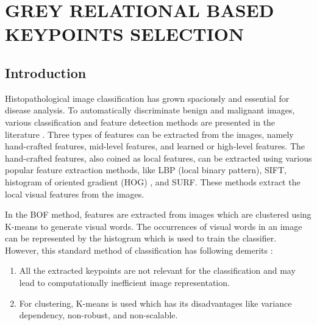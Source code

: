 

\chapter{GREY RELATIONAL BASED KEYPOINTS SELECTION}\label{Ch3:GKS}
\graphicspath{{Chapter3/Chapter3Figs/}{Chapter3/Chapter3Figs/}}

\section{Introduction}\label{ch3:sec:introduction}

Histopathological image classification has grown spaciously and essential for disease analysis. To automatically discriminate benign and malignant images, various classification and feature detection methods are presented in the literature \cite{saraswat2013}. Three types of features can be extracted from the images, namely hand-crafted features, mid-level features, and learned or high-level features. The hand-crafted features, also coined as local features, can be extracted using various popular feature extraction methods, like  LBP (local binary pattern), SIFT, histogram of oriented gradient (HOG) \cite{dalal2005histograms}, and SURF. These methods extract the local visual features from the images. 


In the BOF method, features are extracted from images which are clustered using K-means to generate visual words. The occurrences of visual words in an image can be represented by the histogram which is used to train the classifier. However, this standard method of classification has following demerits \cite{zheng2017}:
\begin{enumerate}
\item All the extracted keypoints are not relevant for the classification and may lead to computationally inefficient image representation.

\item For clustering, K-means is used which has its disadvantages like variance dependency, non-robust, and non-scalable.
\end{enumerate}

